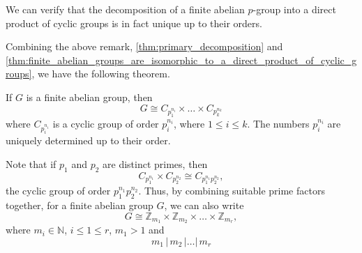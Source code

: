 \begin{remark}
  We can verify that the decomposition of a finite abelian $p$-group into a direct product of cyclic groups is in fact unique up to their orders.
\end{remark}

Combining the above remark, \cref{thm:primary_decomposition} and \cref{thm:finite_abelian_groups_are_isomorphic_to_a_direct_product_of_cyclic_groups}, we have the following theorem.

\begin{thm}
\label{thm:finite_abelian_group_structure}
  If $G$ is a finite abelian group, then
  \begin{equation*}
    G \cong C_{p_1^{n_i}} \times \hdots \times C_{p_k^{n_k}}
  \end{equation*}
  where $C_{p_i^{n_i}}$ is a cyclic group of order $p_i^{n_i}$, where $1 \leq i \leq k$. The numbers $p_i^{n_i}$ are uniquely determined up to their order.
\end{thm}

\begin{remark}
  Note that if $p_1$ and $p_2$ are distinct primes, then
  \begin{equation*}
    C_{p_1^{n_1}} \times C_{p_2^{n_2}} \cong C_{p_1^{n_1} p_2^{n_2}},
  \end{equation*}
  the cyclic group of order $p_1^{n_1} p_2^{n_2}$. Thus, by combining suitable prime factors together, for a finite abelian group $G$, we can also write
  \begin{equation*}
    G \cong \mathbb{Z}_{m_1} \times \mathbb{Z}_{m_2} \times \hdots \times \mathbb{Z}_{m_r},
  \end{equation*}
  where $m_i \in \mathbb{N}$, $i \leq 1 \leq r$, $m_1 > 1$ and
  \begin{equation*}
    m_1 \, \big| \, m_2 \, \big| \hdots \big| \, m_r
  \end{equation*}
\end{remark}

